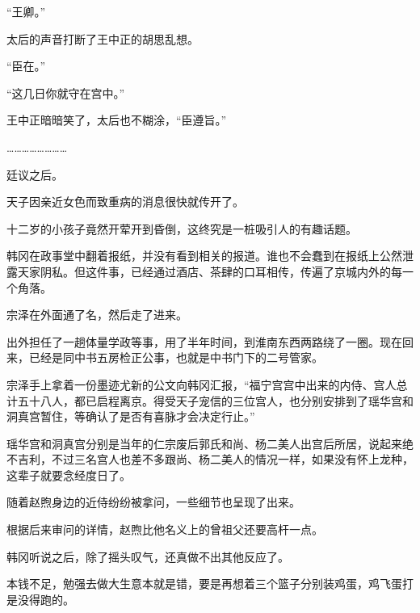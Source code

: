 “王卿。”

太后的声音打断了王中正的胡思乱想。

“臣在。”

“这几日你就守在宫中。”

王中正暗暗笑了，太后也不糊涂，“臣遵旨。”

……………………

廷议之后。

天子因亲近女色而致重病的消息很快就传开了。

十二岁的小孩子竟然开荤开到昏倒，这终究是一桩吸引人的有趣话题。

韩冈在政事堂中翻着报纸，并没有看到相关的报道。谁也不会蠢到在报纸上公然泄露天家阴私。但这件事，已经通过酒店、茶肆的口耳相传，传遍了京城内外的每一个角落。

宗泽在外面通了名，然后走了进来。

出外担任了一趟体量学政等事，用了半年时间，到淮南东西两路绕了一圈。现在回来，已经是同中书五房检正公事，也就是中书门下的二号管家。

宗泽手上拿着一份墨迹尤新的公文向韩冈汇报，“福宁宫宫中出来的内侍、宫人总计五十八人，都已启程离京。得受天子宠信的三位宫人，也分别安排到了瑶华宫和洞真宫暂住，等确认了是否有喜脉才会决定行止。”

瑶华宫和洞真宫分别是当年的仁宗废后郭氏和尚、杨二美人出宫后所居，说起来绝不吉利，不过三名宫人也差不多跟尚、杨二美人的情况一样，如果没有怀上龙种，这辈子就要念经度日了。

随着赵煦身边的近侍纷纷被拿问，一些细节也呈现了出来。

根据后来审问的详情，赵煦比他名义上的曾祖父还要高杆一点。

韩冈听说之后，除了摇头叹气，还真做不出其他反应了。

本钱不足，勉强去做大生意本就是错，要是再想着三个篮子分别装鸡蛋，鸡飞蛋打是没得跑的。
